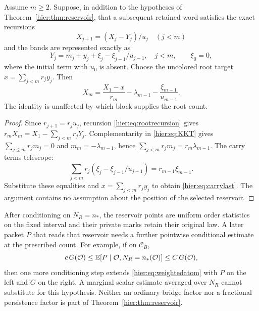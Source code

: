 \begin{proposition}
Assume $m\ge2$. Suppose, in addition to the hypotheses of
Theorem~\ref{hier:thm:reservoir}, that a subsequent retained word satisfies the exact recursions
\begin{equation}
 X_{j+1}=(X_j-Y_j)/u_j\quad(j<m)
 \label{hier:eq:rootrecursion}
\end{equation}
and the bands are represented exactly as
\begin{equation}
 Y_j=m_j+y_j+\xi_j-\xi_{j-1}/u_{j-1},\quad j<m,
 \qquad \xi_0=0,
 \label{hier:eq:carrybands}
\end{equation}
where the initial term with $u_0$ is absent. Choose the uncolored
root target $x=\sum_{j<m}r_jy_j$. Then
\begin{equation}
 X_m=\frac{X_1-x}{r_m}-\lambda_{m-1}
                         -\frac{\xi_{m-1}}{u_{m-1}}.
 \label{hier:eq:carrylast}
\end{equation}
The identity is unaffected by which block supplies the root count.
\end{proposition}
\begin{proof}
Since $r_{j+1}=r_ju_j$, recursion \eqref{hier:eq:rootrecursion} gives
$r_mX_m=X_1-\sum_{j<m}r_jY_j$. Complementarity in
\eqref{hier:eq:KKT} gives $\sum_{j\le m}r_jm_j=0$ and
$m_m=-\lambda_{m-1}$, hence
$\sum_{j<m}r_jm_j=r_m\lambda_{m-1}$. The carry terms telescope:
\[
 \sum_{j<m}r_j(\xi_j-\xi_{j-1}/u_{j-1})
       =r_{m-1}\xi_{m-1}.
\]
Substitute these equalities and $x=\sum_{j<m}r_jy_j$ to obtain
\eqref{hier:eq:carrylast}. The argument contains no assumption about
the position of the selected reservoir.
\end{proof}

\begin{remark}
After conditioning on $N_R=n_*$, the reservoir points are uniform
order statistics on the fixed interval and their private marks
retain their original law. A later packet $P$ that reads that
reservoir needs a further pointwise conditional estimate at the
prescribed count. For example, if on $\mathcal C_B$,
\[
 c\,G(\mathcal O)\le
 \mathbb E[P\mid\mathcal O,N_R=n_*(\mathcal O)]
 \le C\,G(\mathcal O),
\]
then one more conditioning step extends \eqref{hier:eq:weightedatom}
with $P$ on the left and $G$ on the right. A marginal scalar
estimate averaged over $N_R$ cannot substitute for this hypothesis.
Neither an ordinary bridge factor nor a fractional persistence
factor is part of Theorem~\ref{hier:thm:reservoir}.
\end{remark}

